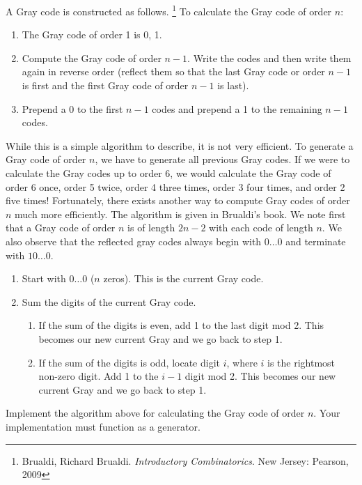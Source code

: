 A Gray code is constructed as follows.
\footnote{Brualdi, Richard Brualdi. \emph{Introductory Combinatorics}. New Jersey: Pearson, 2009}
To calculate the Gray code of order $n$:
\begin{enumerate}
\item The Gray code of order 1 is 0, 1.
\item Compute the Gray code of order $n-1$.  Write the codes and then write them again in reverse order (reflect them so that the last Gray code or order $n-1$ is first and the first Gray code of order $n-1$ is last).
\item Prepend a 0 to the first $n-1$ codes and prepend a 1 to the remaining $n-1$ codes.
\end{enumerate}
While this is a simple algorithm to describe, it is not very efficient.  
To generate a Gray code of order $n$, we have to generate all previous Gray codes.  
If we were to calculate the Gray codes up to order 6, we would calculate the Gray code of order 6 once, order 5 twice, order 4 three times, order 3 four times, and order 2 five times!
Fortunately, there exists another way to compute Gray codes of order $n$ much more efficiently.
The algorithm is given in Brualdi's book.  
We note first that a Gray code of order $n$ is of length $2n-2$ with each code of length $n$.
We also observe that the reflected gray codes always begin with $0\dots0$ and terminate with $10\dots0$.
\begin{enumerate}
\item Start with $0\dots0$ ($n$ zeros).  This is the current Gray code.
\item Sum the digits of the current Gray code.
\begin{enumerate}
\item If the sum of the digits is even, add 1 to the last digit mod 2.
This becomes our new current Gray and we go back to step 1.
\item If the sum of the digits is odd, locate digit $i$, where $i$ is the rightmost non-zero digit.  Add 1 to the $i-1$ digit mod 2.  This becomes our new current Gray and we go back to step 1.
\end{enumerate}
\end{enumerate}

\begin{problem}
\label{prob:brualdi_gray}
Implement the algorithm above for calculating the Gray code of order $n$.
Your implementation must function as a generator.
\end{problem}


